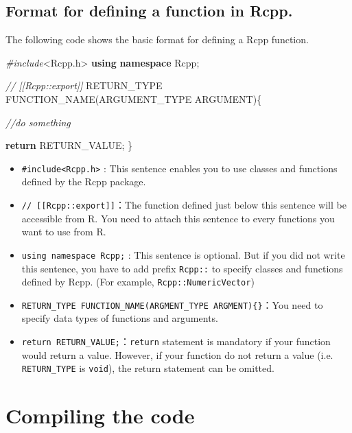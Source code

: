 \documentclass[]{book}
\newenvironment{Shaded}{\begin{snugshade}}{\end{snugshade}}
\newcommand{\CommentTok}[1]{\textcolor[rgb]{0.56,0.35,0.01}{\textit{#1}}}
\newcommand{\ControlFlowTok}[1]{\textcolor[rgb]{0.13,0.29,0.53}{\textbf{#1}}}
\newcommand{\ImportTok}[1]{#1}
\newcommand{\KeywordTok}[1]{\textcolor[rgb]{0.13,0.29,0.53}{\textbf{#1}}}
\newcommand{\NormalTok}[1]{#1}
\newcommand{\PreprocessorTok}[1]{\textcolor[rgb]{0.56,0.35,0.01}{\textit{#1}}}
\begin{document}
\hypertarget{format-for-defining-a-function-in-rcpp.}{%
\subsection{Format for defining a function in Rcpp.}\label{format-for-defining-a-function-in-rcpp.}}

The following code shows the basic format for defining a Rcpp function.

\begin{Shaded}
\begin{Highlighting}[]
\PreprocessorTok{#include}\ImportTok{<Rcpp.h>}
\KeywordTok{using} \KeywordTok{namespace}\NormalTok{ Rcpp;}

\CommentTok{// [[Rcpp::export]]}
\NormalTok{RETURN_TYPE FUNCTION_NAME(ARGUMENT_TYPE ARGUMENT)\{}

    \CommentTok{//do something}

    \ControlFlowTok{return}\NormalTok{ RETURN_VALUE;}
\NormalTok{\}}
\end{Highlighting}
\end{Shaded}

\begin{itemize}
\item
  \texttt{\#include\textless{}Rcpp.h\textgreater{}} : This sentence enables you to use classes and functions defined by the Rcpp package.
\item
  \texttt{//\ {[}{[}Rcpp::export{]}{]}}：The function defined just below this sentence will be accessible from R. You need to attach this sentence to every functions you want to use from R.
\item
  \texttt{using\ namespace\ Rcpp;} : This sentence is optional. But if you did not write this sentence, you have to add prefix \texttt{Rcpp::} to specify classes and functions defined by Rcpp. (For example, \texttt{Rcpp::NumericVector})
\item
  \texttt{RETURN\_TYPE\ FUNCTION\_NAME(ARGMENT\_TYPE\ ARGMENT)\{\}}：You need to specify data types of functions and arguments.
\item
  \texttt{return\ RETURN\_VALUE;}：\texttt{return} statement is mandatory if your function would return a value. However, if your function do not return a value (i.e. \texttt{RETURN\_TYPE} is \texttt{void}), the return statement can be omitted.
\end{itemize}

\hypertarget{compiling-the-code}{%
\section{Compiling the code}\label{compiling-the-code}}
\end{document}
